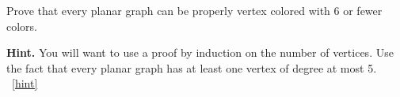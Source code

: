 \documentclass{book}
\begin{document}
\setcounter{project}{38}
\addtocounter{project}{-1}
\begin{activity}[]\label{activity-31}
\hypertarget{p-365}{}%
Prove that every planar graph can be properly vertex colored with 6 or fewer colors.%
\par\smallskip%
\noindent\textbf{Hint.}\hypertarget{hint-11}{}\quad%
\hypertarget{p-366}{}%
You will want to use a proof by induction on the number of vertices.  Use the fact that every planar graph has at least one vertex of degree at most 5.%
~\hfill{\tiny\hyperlink{a-38}{[hint]}\hypertarget{q-38}{}}\end{activity}

\clearpage
\end{document}
